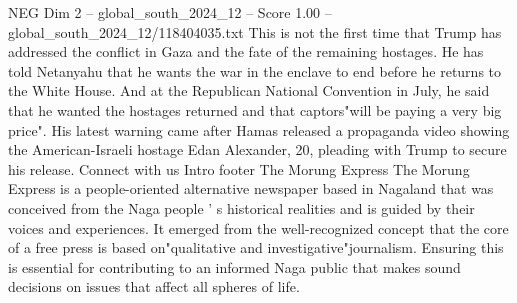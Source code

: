 \begin{textsample}{NEG Dim 2 – global\_south\_2024\_12 – Score 1.00 – global\_south\_2024\_12/118404035.txt}
This is not the first time that Trump has addressed the conflict in Gaza and the fate of the remaining hostages.
He has told Netanyahu that he wants the war in the enclave to end before he returns to the White House.
And at the Republican National Convention in July, he said that he wanted the hostages returned and that captors"will be paying a very big price".
His latest warning came after Hamas released a propaganda video showing the American-Israeli hostage Edan Alexander, 20, pleading with Trump to secure his release.
Connect with us Intro footer The Morung Express The Morung Express is a people-oriented alternative newspaper based in Nagaland that was conceived from the Naga people ' s historical realities and is guided by their voices and experiences.
It emerged from the well-recognized concept that the core of a free press is based on"qualitative and investigative"journalism.
Ensuring this is essential for contributing to an informed Naga public that makes sound decisions on issues that affect all spheres of life.

\end{textsample}
